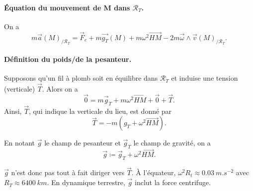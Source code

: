             \paragraph{Équation du mouvement de M dans $\mathcal{R}_T$.}
            On a 
            \begin{equation*}
                m\vec{a}(M)_{/\mathcal{R}_T}=\vec{F}_e+m\vec{g_T}(M)+m\omega^{2}\vec{HM}-2m\vec{\omega}\wedge\vec{v}(M)_{/\mathcal{R}_T}.
            \end{equation*}

            \paragraph{Définition du poids/de la pesanteur.}
            Supposons qu'un fil à plomb soit en équilibre dans $\mathcal{R}_T$ et induise une tension (verticale) $\vec{T}$. Alors on a 
            \begin{equation*}
                \vec{0}=m\vec{g}_T+m\omega^{2}\vec{HM}+\vec{0}+\vec{T}.
            \end{equation*}
            Ainsi, $\vec{T}$, qui indique la verticale du lieu, est donné par
            \begin{equation*}
                \vec{T}=-m\left(g_T+\omega^{2}\vec{HM}\right).
            \end{equation*}

            \begin{definition}
                    En notant $\vec{g}$ le champ de pesanteur et $\vec{g}_{T}$ le champ de gravité, on a
                    \begin{equation*}
                        \boxed{
                        \vec{g}\coloneqq \vec{g}_T+\omega^{2}\vec{HM}.}
                    \end{equation*}
            \end{definition}

            $\vec{g}$ n'est donc pas tout à fait diriger vers $\vec{T}$. À l'équateur, $\omega^{2}R_t\approx0.03~m.s^{-2}$ avec $R_T\approx 6400~km$. En dynamique terrestre, $\vec{g}$ inclut la force centrifuge.
        

        